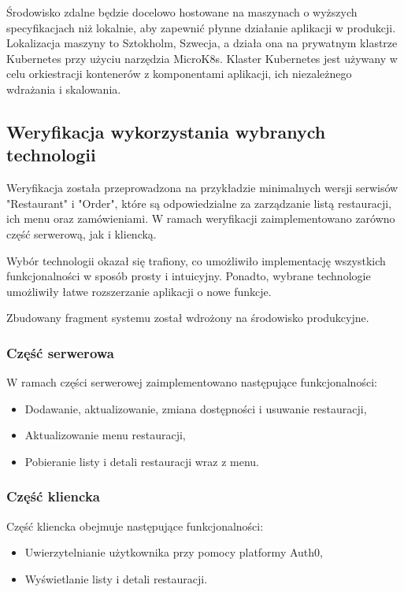 Środowisko zdalne będzie docelowo hostowane na maszynach o wyższych specyfikacjach niż lokalnie, aby zapewnić płynne działanie aplikacji w produkcji. Lokalizacja maszyny to Sztokholm, Szwecja, a działa ona na prywatnym klastrze Kubernetes przy użyciu narzędzia MicroK8s. Klaster Kubernetes jest używany w celu orkiestracji kontenerów z komponentami aplikacji, ich niezależnego wdrażania i skalowania.

\subsection{Weryfikacja wykorzystania wybranych technologii}

Weryfikacja została przeprowadzona na przykładzie minimalnych wersji serwisów "Restaurant" i "Order", które są odpowiedzialne za zarządzanie listą restauracji, ich menu oraz zamówieniami. W ramach weryfikacji zaimplementowano zarówno część serwerową, jak i kliencką.

Wybór technologii okazał się trafiony, co umożliwiło implementację wszystkich funkcjonalności w sposób prosty i intuicyjny. Ponadto, wybrane technologie umożliwiły łatwe rozszerzanie aplikacji o nowe funkcje.

Zbudowany fragment systemu został wdrożony na środowisko produkcyjne.

\subsubsection{Część serwerowa}

W ramach części serwerowej zaimplementowano następujące funkcjonalności:

\begin{itemize}
    \item Dodawanie, aktualizowanie, zmiana dostępności i usuwanie restauracji,
    \item Aktualizowanie menu restauracji,
    \item Pobieranie listy i detali restauracji wraz z menu.
\end{itemize}

\subsubsection{Część kliencka}

Część kliencka obejmuje następujące funkcjonalności:

\begin{itemize}
    \item Uwierzytelnianie użytkownika przy pomocy platformy Auth0,
    \item Wyświetlanie listy i detali restauracji.
\end{itemize}

